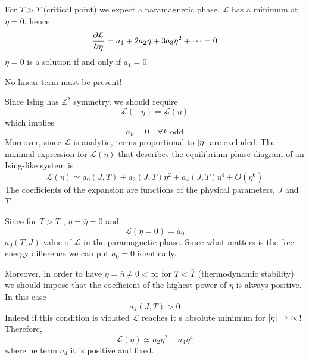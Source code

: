 \documentclass[../main/main.tex]{subfiles}
\begin{document}
For \( T > \bar{T}  \) (critical point) we expect a paramagnetic phase. \( \mathcal{L} \) has a minimum at \( \eta =0 \), hence
\begin{equation}
  \pdv{\mathcal{L}}{\eta } = a_1 + 2 a _2 \eta + 3 a _3 \eta ^2 + \dots = 0
\end{equation}
\( \eta = 0 \) is a solution if and only if \( a_1 = 0 \).
 \begin{remark}
No linear term must be present!
\end{remark}
Since Ising has \( \mathbb{Z}^2 \) symmetry, we should require
\begin{equation}
  \mathcal{L} (-\eta ) =   \mathcal{L} (\eta )
\end{equation}
which implies
\begin{equation}
  a_k = 0 \quad \forall k  \text{ odd}
\end{equation}
Moreover, since \( \mathcal{L} \) is analytic, terms proportional to \( \abs{\eta }  \)  are excluded.
The minimal expression for \( \mathcal{L}(\eta ) \) that describes the equilibrium phase diagram of an Ising-like system is
\begin{equation}
  \mathcal{L} (\eta ) \simeq a_0 (J,T) + a_2 (J,T) \eta  ^2 + a_4  (J,T) \eta  ^4 + O(\eta ^6)
\end{equation}
The coefficients of the expansion are functions of the physical parameters, \( J \) and \( T \).

Since for \( T > \bar{T}  \)  , \( \eta = \bar{\eta } = 0  \) and
\begin{equation}
  \mathcal{L} (\eta =0) = a_0
\end{equation}
\( a_0 (T,J) \) value of \( \mathcal{L} \) in the paramagnetic phase. Since what matters is the free-energy difference we can put \( a_0 =0 \) identically.

Moreover, in order to have \( \eta = \bar{\eta } \neq 0 < \infty   \) for \( T < \bar{T} \) (thermodynamic stability) we should impose that the coefficient of the highest power of \( \eta  \) is always positive. In this case
\begin{equation}
  a_4 (J,T)>0
\end{equation}
   Indeed if this condition is violated \( \mathcal{L} \) reaches it s absolute minimum for \( \abs{\eta } \rightarrow \infty   \)!
Therefore,
\begin{equation}
    \mathcal{L} (\eta ) \simeq  a_2 \eta  ^2 + a_4  \eta  ^4
\end{equation}
where he term \( a_4 \) it is positive and fixed.
\end{document}
